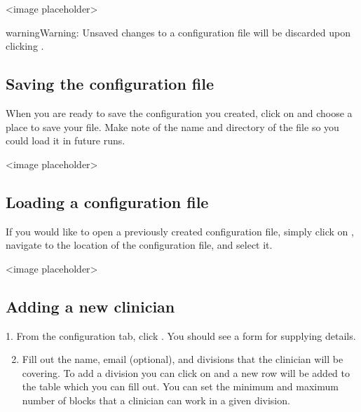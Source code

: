 \documentclass[letterpaper,10pt,english]{sphinxmanual}
\begin{document}
\textless{}image placeholder\textgreater{}

\begin{sphinxadmonition}{warning}{Warning:}
Unsaved changes to a configuration file will be discarded upon clicking
.
\end{sphinxadmonition}


\subsection{Saving the configuration file}
\label{\detokenize{index:saving-the-configuration-file}}
When you are ready to save the configuration you created, click on
 and choose a place to save your file. Make note of the name
and directory of the file so you could load it in future runs.

\textless{}image placeholder\textgreater{}


\subsection{Loading a configuration file}
\label{\detokenize{index:loading-a-configuration-file}}
If you would like to open a previously created configuration file, simply
click on , navigate to the location of the configuration file,
and select it.

\textless{}image placeholder\textgreater{}


\subsection{Adding a new clinician}
\label{\detokenize{index:adding-a-new-clinician}}
1. From the configuration tab, click . You should see a
form for supplying details.

\begin{figure}[htbp]
\centering
{}\end{figure}

\begin{DUlineblock}{0em}
\item[] 
\end{DUlineblock}
\begin{enumerate}
\setcounter{enumi}{1}
\item {} 
Fill out the name, email (optional), and divisions that the clinician
will be covering. To add a division you can click on  and a new row
will be added to the table which you can fill out. You can set the minimum
and maximum number of blocks that a clinician can work in a given division.

\end{enumerate}
\end{document}
